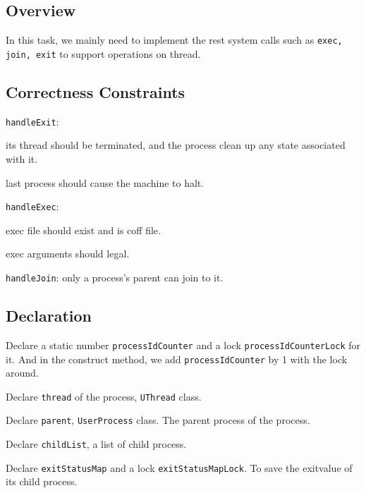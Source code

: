 \documentclass{article}
\begin{document}
\subsection{Overview}
In this task, we mainly need to implement the rest system calls such as \texttt{exec, join, exit} to support operations on thread.
\subsection{Correctness Constraints}
\begin{compactitem}
\item \texttt{handleExit}:
\begin{compactitem}[$\bullet$]
\item its thread should be terminated, and the process clean up any state associated with it.
\item last process should cause the machine to halt.
\end{compactitem}
\item \texttt{handleExec}:
\begin{compactitem}[$\bullet$]
\item exec file should exist and is coff file.
\item exec arguments should legal.
\end{compactitem}
\item \texttt{handleJoin}: only a process's parent can join to it.
\end{compactitem}
\subsection{Declaration}
\begin{compactitem}
\item Declare a static number \texttt{processIdCounter} and a lock \texttt{processIdCounterLock} for it. And in the construct method, we add \texttt{processIdCounter} by 1 with the lock around.
\item Declare \texttt{thread} of the process, \texttt{UThread} class.
\item Declare \texttt{parent}, \texttt{UserProcess} class. The parent process of the process.
\item Declare \texttt{childList}, a list of child process.
\item Declare \texttt{exitStatusMap} and a lock \texttt{exitStatusMapLock}. To save the exitvalue of its child process.
\end{compactitem}
\end{document}

